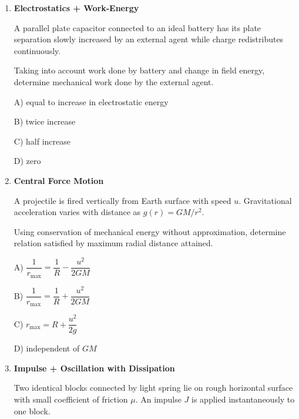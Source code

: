 \documentclass[12pt]{article}
\begin{document}
\begin{enumerate}
A satellite of mass $m$ moves in a nearly circular orbit of radius $R$ around Earth. It experiences a small drag force proportional to instantaneous velocity $F=-kv$.

Assuming decay is slow so orbit remains nearly circular at each instant, use energy balance to determine proportional dependence of $\dfrac{dR}{dt}$ on radius.

A) $R$

B) $\dfrac{1}{R}$

C) $\dfrac{1}{R^2}$

D) constant

\item \textbf{Electrostatics + Work-Energy}

A parallel plate capacitor connected to an ideal battery has its plate separation slowly increased by an external agent while charge redistributes continuously.

Taking into account work done by battery and change in field energy, determine mechanical work done by the external agent.

A) equal to increase in electrostatic energy

B) twice increase

C) half increase

D) zero

\item \textbf{Central Force Motion}

A projectile is fired vertically from Earth surface with speed $u$. Gravitational acceleration varies with distance as $g(r)=GM/r^2$.

Using conservation of mechanical energy without approximation, determine relation satisfied by maximum radial distance attained.

A) $ \dfrac{1}{r_{\max}}=\dfrac{1}{R}-\dfrac{u^2}{2GM} $

B) $ \dfrac{1}{r_{\max}}=\dfrac{1}{R}+\dfrac{u^2}{2GM} $

C) $ r_{\max}=R+\dfrac{u^2}{2g} $

D) independent of $GM$

\item \textbf{Impulse + Oscillation with Dissipation}

Two identical blocks connected by light spring lie on rough horizontal surface with small coefficient of friction $\mu$. An impulse $J$ is applied instantaneously to one block.


\end{enumerate}
\end{document}

